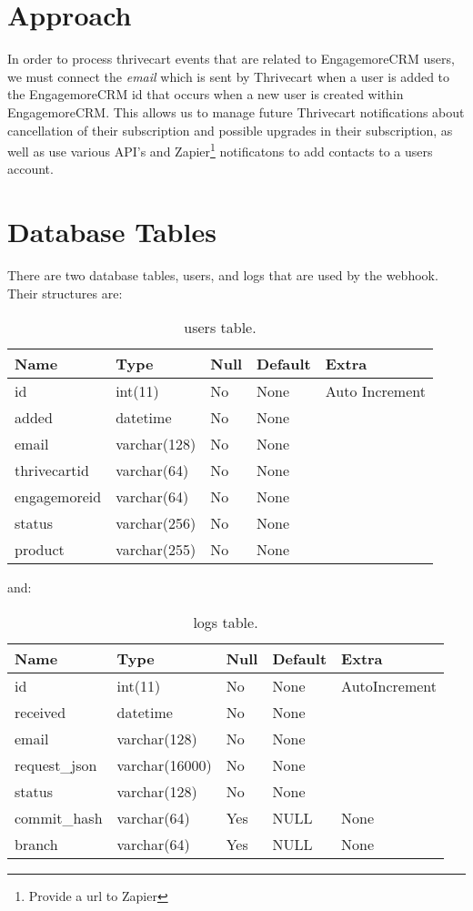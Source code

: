 \documentclass[final,letterpaper,12pt]{article}
\begin{document}
\section{Approach}
\noindent In order to process thrivecart events that are related to EngagemoreCRM users, we must connect
the {\it email} which is sent by Thrivecart when a user is added to the EngagemoreCRM  id that
occurs when a new user is created within EngagemoreCRM.  This allows us to manage future Thrivecart
notifications about cancellation of their subscription and possible upgrades in their subscription, as well as use various API's and Zapier\footnote{Provide a url to Zapier} notificatons to add contacts to a users account.

\newpage
\section{Database Tables}
\noindent There are two database tables, users, and logs that are used by the webhook.  Their structures are:
\smallskip

\begin{table}[ht]
\begin{tabular}{|l|l|l|l|l|}
\hline
Name&Type&Null&Default&Extra\\ \hline
id&int(11)&No&None&Auto Increment\\
added&datetime&No&None&\\
email&varchar(128)&No&None&\\
thrivecartid&varchar(64)&No&None&\\
engagemoreid&varchar(64)&No&None&\\
status&varchar(256)&No&None&\\
product&varchar(255)&No&None&\\
\hline
\end{tabular}
\caption{\label{tab:users}users table.}
\end{table}

\newpage
\noindent and:
\begin{table}[ht]
\begin{tabular}{|l|l|l|l|l|}
\hline
Name&Type&Null&Default&Extra\\ \hline
id&int(11)&No&None&AutoIncrement\\
received&datetime&No&None&\\
email&varchar(128)&No&None&\\
request\_json&varchar(16000)&No&None&\\
status&varchar(128)&No&None&\\
commit\_hash&varchar(64)&Yes&NULL&None\\
branch&varchar(64)&Yes&NULL&None\\
\hline
\end{tabular}
\caption{\label{tab:logs}logs table.}
\end{table}
\end{document}
